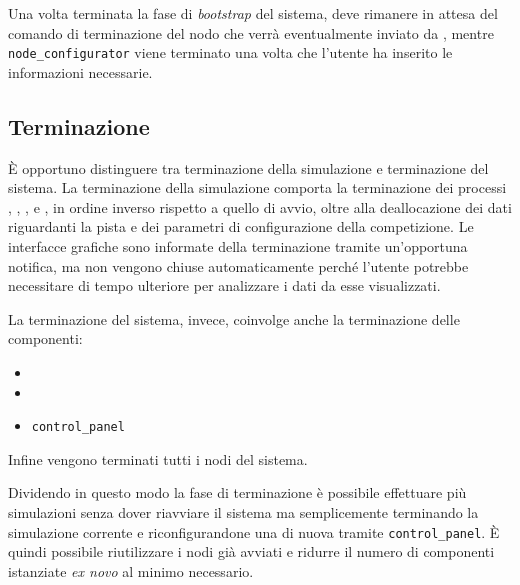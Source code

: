 Una volta terminata la fase di \textit{bootstrap} del sistema, \nodeman{} deve rimanere in attesa del comando di terminazione del nodo che verrà eventualmente inviato da \bootserv{}, mentre \texttt{node\_configurator} viene terminato una volta che l'utente ha inserito le informazioni necessarie.

\subsection{Terminazione}
\`E opportuno distinguere tra terminazione della simulazione e terminazione del sistema.
La terminazione della simulazione comporta la terminazione dei processi \sched{}, \evdisp{}, \team{}, \car{} e \weather{}, in ordine inverso rispetto a quello di avvio, oltre alla deallocazione dei dati riguardanti la pista e dei parametri di configurazione della competizione. Le interfacce grafiche sono informate della terminazione tramite un'opportuna notifica, ma non vengono chiuse automaticamente perché l'utente potrebbe necessitare di tempo ulteriore per analizzare i dati da esse visualizzati.

La terminazione del sistema, invece, coinvolge anche la terminazione delle componenti:
\begin{itemize}
\item \bootserv{}
\item \nodeman{}
\item \texttt{control\_panel}
\end{itemize}
Infine vengono terminati tutti i nodi del sistema.

Dividendo in questo modo la fase di terminazione è possibile effettuare più simulazioni senza dover riavviare il sistema ma semplicemente terminando la simulazione corrente e riconfigurandone una di nuova tramite \texttt{control\_panel}. \`E quindi possibile riutilizzare i nodi già avviati e ridurre il numero di componenti istanziate \textit{ex novo} al minimo necessario.
